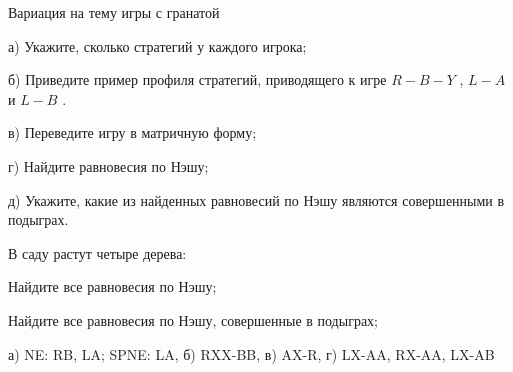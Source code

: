 \begin{problem}
 Вариация на тему игры с гранатой\par
а) Укажите, сколько стратегий у каждого игрока;\par
б) Приведите пример профиля стратегий, приводящего к игре  $R-B-Y$ ,  $L-A$  и  $L-B$ .\par
в) Переведите игру в матричную форму;\par
г) Найдите равновесия по Нэшу;\par
д) Укажите, какие из найденных равновесий по Нэшу являются совершенными в подыграх.


\begin{sol}

\end{sol}
\end{problem}



\begin{problem}

В саду растут четыре дерева:\par
{}
Найдите все равновесия по Нэшу;\par
Найдите все равновесия по Нэшу, совершенные в подыграх;



\begin{sol}
 а) NE: RB, LA; SPNE: LA, б) RXX-BB, в) AX-R, г) LX-AA, RX-AA, LX-AB
\end{sol}
\end{problem}




